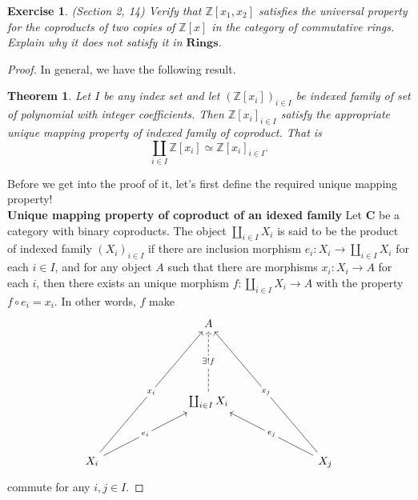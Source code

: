 \documentclass[a4paper, 11pt]{book}
\theoremstyle{plain}
\newtheorem{exercise}{Exercise}
\newtheorem*{theorem}{Theorem}
\theoremstyle{plain}
\newcommand{\mb}{\mathbf}
\newcommand{\arr}{\rightarrow}
\newcommand{\Z}{\mathbb{Z}}
\newcommand{\C}{\mathbf{C}}
\begin{document}
  \begin{exercise}
    (Section 2, 14)
    Verify that $\Z[x_1,x_2]$ satisfies the universal property for the coproducts of two copies of $\Z[x]$ in the category of commutative rings. Explain why it does not satisfy it in $\mb{Rings}$.
  \end{exercise}
  \begin{proof}
    In general, we have the following result.
    \begin{theorem}
      Let $I$ be any index set and let $(\Z[x_i])_{i \in I}$ be indexed family of set of polynomial with integer coefficients. Then $\Z[x_i]_{i \in I}$ satisfy the appropriate unique mapping property of indexed family of coproduct. That is 
      $$ \coprod_{i \in I} \Z[x_i] \simeq \Z[x_i]_{i \in I}.$$
    \end{theorem}
    Before we get into the proof of it, let's first define the required unique mapping property! \\
\newpage
    \textbf{Unique mapping property of coproduct of an idexed family} Let $\C$ be a category with binary coproducts. The object $\coprod_{i \in I} X_i$ is said to be the product of indexed family $(X_i)_{i \in I}$ if there are inclusion morphism $e_i:X_i \arr \coprod_{i \in I} X_i$ for each $i \in I$, and for any object $A$ such that there are morphisms $x_i:X_i \arr A$ for each $i$, then there exists an unique morphism $f:\coprod_{i \in I} X_i \arr A$ with the property $f \circ e_i = x_i$. In other words, $f$ make 
    \[\begin{tikzcd}
      &&& A \\
      \\
      \\
      &&& {\coprod_{i \in I} X_i} \\
      \\
      {X_i} &&&&&& {X_j}
      \arrow["{\exists ! f}"{description}, dashed, from=4-4, to=1-4]
      \arrow["{x_i}"{description}, from=6-1, to=1-4]
      \arrow["{x_j}"{description}, from=6-7, to=1-4]
      \arrow["{e_i}"{description}, from=6-1, to=4-4]
      \arrow["{e_j}"{description}, from=6-7, to=4-4]
    \end{tikzcd}\]
    commute for any $i,j \in I$.


\end{proof}
\end{document}
